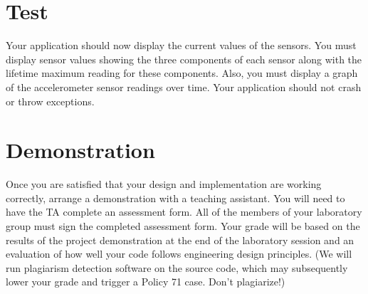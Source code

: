 \documentclass[10pt]{article}
\begin{document}





\section{Test}
Your application should now display the current values of the sensors. You must display sensor values showing the three components of each sensor along with the lifetime maximum reading for these components. Also, you must display a graph of the accelerometer sensor readings over time. Your application should not crash or throw exceptions.

\section{Demonstration}
Once you are satisfied that your design and implementation are working correctly, arrange a demonstration with a teaching assistant.  You will need to have the TA complete an assessment form.  All of the members of your laboratory group must sign the completed assessment form.  Your grade will be based on the results of the project demonstration at the end of the laboratory session and an evaluation of how well your code follows engineering design principles. (We will run plagiarism detection software on the source code, which may subsequently lower your grade and trigger a Policy 71 case. Don't plagiarize!)
\end{document}
